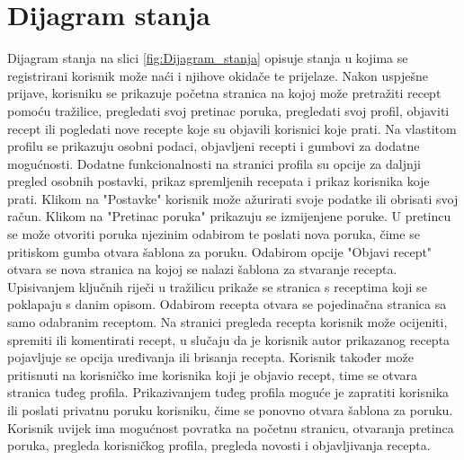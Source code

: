 			
			\eject
		
		\section{Dijagram stanja}
			
			
			
			Dijagram stanja na slici \ref{fig:Dijagram_stanja} opisuje stanja u kojima se registrirani korisnik može naći i njihove okidače te prijelaze. Nakon uspješne prijave, korisniku se prikazuje početna stranica na kojoj može pretražiti recept pomoću tražilice, pregledati svoj pretinac poruka, pregledati svoj profil, objaviti recept ili pogledati nove recepte koje su objavili korisnici koje prati. Na vlastitom profilu se prikazuju osobni podaci, objavljeni recepti i gumbovi za dodatne mogućnosti. Dodatne funkcionalnosti na stranici profila su opcije za daljnji pregled osobnih postavki, prikaz spremljenih recepata i prikaz korisnika koje prati. Klikom na "Postavke" korisnik može ažurirati svoje podatke ili obrisati svoj račun. Klikom na "Pretinac poruka" prikazuju se izmijenjene poruke. U pretincu se može otvoriti poruka njezinim odabirom te poslati nova poruka, čime se pritiskom gumba otvara šablona za poruku. Odabirom opcije "Objavi recept" otvara se nova stranica na kojoj se nalazi šablona za stvaranje recepta. Upisivanjem ključnih riječi u tražilicu prikaže se stranica s receptima koji se poklapaju s danim opisom. Odabirom recepta otvara se pojedinačna stranica sa samo odabranim receptom. Na stranici pregleda recepta korisnik može ocijeniti, spremiti ili komentirati recept, u slučaju da je korisnik autor prikazanog recepta pojavljuje se opcija uređivanja ili brisanja recepta. Korisnik također može pritisnuti na korisničko ime korisnika koji je objavio recept, time se otvara stranica tuđeg profila. Prikazivanjem tuđeg profila moguće je zapratiti korisnika ili poslati privatnu poruku korisniku, čime se ponovno otvara šablona za poruku. Korisnik uvijek ima mogućnost povratka na početnu stranicu, otvaranja pretinca poruka, pregleda korisničkog profila, pregleda novosti i objavljivanja recepta.
